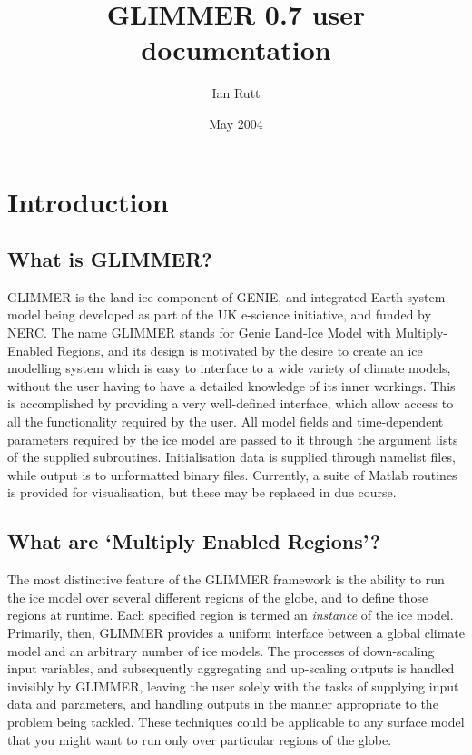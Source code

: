 \documentclass[11pt]{article}
\begin{document}
\title{GLIMMER 0.7 user documentation}
\date{May 2004}
\author{Ian Rutt}
\maketitle

\section{Introduction}

\subsection{What is GLIMMER?}

GLIMMER is the land ice component of GENIE, and integrated Earth-system model
being developed as part of the UK e-science initiative, and funded by
NERC. The name GLIMMER stands for Genie Land-Ice Model with Multiply-Enabled
Regions, and its design is motivated by the desire to
create an ice modelling system which is easy to interface to a wide variety of
climate models, without the user having to have a detailed knowledge of its
inner workings. This is accomplished by providing a very well-defined
interface, which allow access to all the functionality required by the
user. All model fields and time-dependent parameters required by the ice model
are passed to it through the argument lists of the supplied
subroutines. Initialisation data is supplied through namelist files, while
output is to unformatted binary files. Currently, a suite of Matlab routines
is provided for visualisation, but these may be replaced in due course.

\subsection{What are `Multiply Enabled Regions'?}

The most distinctive feature of the GLIMMER framework is the ability to
run the ice model over several different regions of the globe, and to define
those regions at runtime. Each specified region is termed an \emph{instance}
of the ice model. Primarily, then, GLIMMER provides a uniform interface
between a global climate model and an arbitrary number of ice models. The
processes of down-scaling input variables, and subsequently aggregating and
up-scaling outputs is handled invisibly by GLIMMER, leaving the user solely
with the tasks of supplying input data and parameters, and handling outputs in
the manner appropriate to the problem being tackled. These techniques could be
applicable to any surface model that you might want to run only over
particular regions of the globe.
\end{document}
